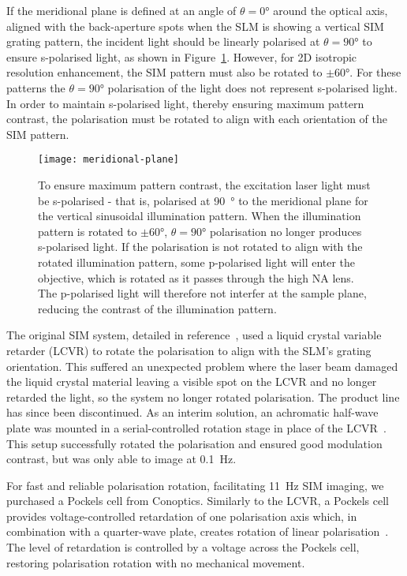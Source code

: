 If the meridional plane is defined at an angle of $\theta=0\si{\degree}$ around the optical axis, aligned with the back-aperture spots when the SLM is showing a vertical SIM grating pattern, the incident light should be linearly polarised at $\theta=90\si{\degree}$ to ensure s-polarised light, as shown in Figure~\ref{fig:meridional-plane}.
However, for 2D isotropic resolution enhancement, the SIM pattern must also be rotated to $\pm60\si{\degree}$.
For these patterns the $\theta=90\si{\degree}$ polarisation of the light does not represent s-polarised light.
In order to maintain s-polarised light, thereby ensuring maximum pattern contrast, the polarisation must be rotated to align with each orientation of the SIM pattern.

\begin{figure}[tbp]
\centering
\texttt{[image: meridional-plane]}
\caption[LAG SIM: Laser polarisation must be perpendicular to the sinusoidal illumination for high pattern contrast]{To ensure maximum pattern contrast, the excitation laser light must be s-polarised - that is, polarised at \SI{90}{\degree} to the meridional plane for the vertical sinusoidal illumination pattern. When the illumination pattern is rotated to $\pm60\si{\degree}$, $\theta=90\si{\degree}$ polarisation no longer produces s-polarised light. If the polarisation is not rotated to align with the rotated illumination pattern, some p-polarised light will enter the objective, which is rotated as it passes through the high NA lens. The p-polarised light will therefore not interfer at the sample plane, reducing the contrast of the illumination pattern.} \label{fig:meridional-plane}
\end{figure}

The original SIM system, detailed in reference~\cite{young2016guide}, used a liquid crystal variable retarder (LCVR) to rotate the polarisation to align with the SLM's grating orientation.
This suffered an unexpected problem where the laser beam damaged the liquid crystal material leaving a visible spot on the LCVR and no longer retarded the light, so the system no longer rotated polarisation.
The product line has since been discontinued.
As an interim solution, an achromatic half-wave plate was mounted in a serial-controlled rotation stage in place of the LCVR~\cite[\textit{ch. 8}]{hecht2017optics}.
This setup successfully rotated the polarisation and ensured good modulation contrast, but was only able to image at \SI{0.1}{\hertz}.

For fast and reliable polarisation rotation, facilitating \SI{11}{\hertz} SIM imaging, we purchased a Pockels cell from Conoptics.
Similarly to the LCVR, a Pockels cell provides voltage-controlled retardation of one polarisation axis which, in combination with a quarter-wave plate, creates rotation of linear polarisation~\cite[\textit{ch. 8}]{hecht2017optics}.
The level of retardation is controlled by a voltage across the Pockels cell, restoring polarisation rotation with no mechanical movement.

